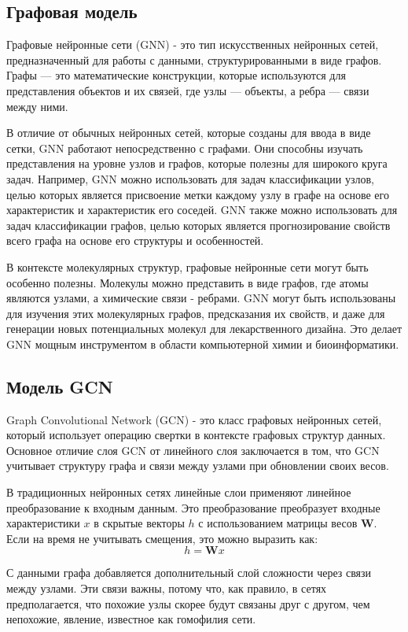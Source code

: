 \subsection{Графовая модель}
Графовые нейронные сети (GNN) - это тип искусственных нейронных сетей, предназначенный для работы с данными, структурированными в виде графов. Графы — это математические конструкции, которые используются для представления объектов и их связей, где узлы — объекты, а ребра — связи между ними.

В отличие от обычных нейронных сетей, которые созданы для ввода в виде сетки, GNN работают непосредственно с графами. Они способны изучать представления на уровне узлов и графов, которые полезны для широкого круга задач. Например, GNN можно использовать для задач классификации узлов, целью которых является присвоение метки каждому узлу в графе на основе его характеристик и характеристик его соседей. GNN также можно использовать для задач классификации графов, целью которых является прогнозирование свойств всего графа на основе его структуры и особенностей.

В контексте молекулярных структур, графовые нейронные сети могут быть особенно полезны. Молекулы можно представить в виде графов, где атомы являются узлами, а химические связи - ребрами. GNN могут быть использованы для изучения этих молекулярных графов, предсказания их свойств, и даже для генерации новых потенциальных молекул для лекарственного дизайна. Это делает GNN мощным инструментом в области компьютерной химии и биоинформатики.



\subsection{Модель GCN}
Graph Convolutional Network (GCN) \cite{kipf2017semisupervised} - это класс графовых нейронных сетей, который использует операцию свертки в контексте графовых структур данных. Основное отличие слоя GCN от линейного слоя заключается в том, что GCN учитывает структуру графа и связи между узлами при обновлении своих весов.

В традиционных нейронных сетях линейные слои применяют линейное преобразование к входным данным. Это преобразование преобразует входные характеристики $x$ в скрытые векторы $h$ с использованием матрицы весов $\mathbf{W}$. Если на время не учитывать смещения, это можно выразить как: 
$$h = \mathbf{W}x$$

С данными графа добавляется дополнительный слой сложности через связи между узлами. Эти связи важны, потому что, как правило, в сетях предполагается, что похожие узлы скорее будут связаны друг с другом, чем непохожие, явление, известное как гомофилия сети.


